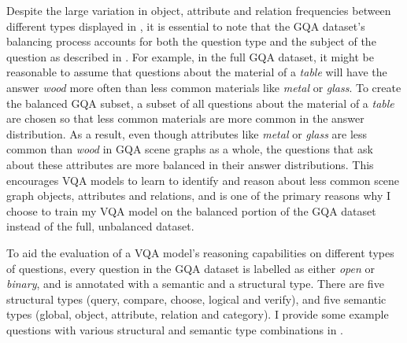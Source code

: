 Despite the large variation in object, attribute and relation frequencies between different types displayed in \figureautorefname{ \ref{fig:gqa_scene_graph_object_relation_attribute_distribution}}, it is essential to note that the GQA dataset's balancing process accounts for both the question type and the subject of the question as described in \sectionautorefname{ \ref{section:vqa_datasets}}. For example, in the full GQA dataset, it might be reasonable to assume that questions about the material of a \textit{table} will have the answer \textit{wood} more often than less common materials like \textit{metal} or \textit{glass}. To create the balanced GQA subset, a subset of all questions about the material of a \textit{table} are chosen so that less common materials are more common in the answer distribution. As a result, even though attributes like \textit{metal} or \textit{glass} are less common than \textit{wood} in GQA scene graphs as a whole, the questions that ask about these attributes are more balanced in their answer distributions. This encourages VQA models to learn to identify and reason about less common scene graph objects, attributes and relations, and is one of the primary reasons why I choose to train my VQA model on the balanced portion of the GQA dataset instead of the full, unbalanced dataset.

To aid the evaluation of a VQA model's reasoning capabilities on different types of questions, every question in the GQA dataset is labelled as either \textit{open} or \textit{binary}, and is annotated with a semantic and a structural type. There are five structural types (query, compare, choose, logical and verify), and five semantic types (global, object, attribute, relation and category). I provide some example questions with various structural and semantic type combinations in \tableautorefname{ \ref{table:gqa_question_samples}}.

